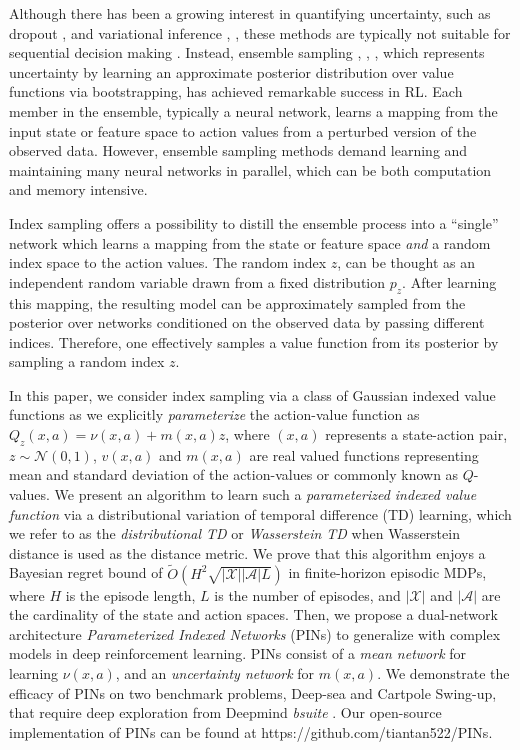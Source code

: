 \documentclass[letterpaper]{article} %
\newcommand{\Sp}[1]{\left(#1\right)}
\newcommand{\abs}[1]{\left|#1\right|}
\newcommand{\aX}{\abs{\mathcal{X}}}
\newcommand{\aA}{\abs{\mathcal{A}}}
\theoremstyle{definition}
\begin{document}
Although there has been a growing interest in quantifying uncertainty, such as dropout \cite{srivastava2014dropout}, \cite{gal2016dropout} and variational inference \cite{fortunato2017noisy}, \cite{touati2018randomized}, these methods are typically not suitable for sequential decision making \cite{osband2018randomized}. Instead, ensemble sampling \cite{osband2016deep}, \cite{lu2017ensemble}, \cite{osband2018randomized}, which represents uncertainty by learning an approximate posterior distribution over value functions via bootstrapping, has achieved remarkable success in RL. Each member in the ensemble, typically a neural network, learns a mapping from the input state or feature space to action values from a perturbed version of the observed data. However, ensemble sampling methods demand learning and maintaining many neural networks in parallel, which can be both computation and memory intensive.

Index sampling \cite{posteriorsampling2019} offers a possibility to distill the ensemble process into a ``single'' network which learns a mapping from the state or feature space \emph{and} a random index space to the action values. The random index $z$, can be thought as an independent random variable drawn from a fixed distribution $p_z$. After learning this mapping, the resulting model can be approximately sampled from the posterior over networks conditioned on the observed data by passing different indices. Therefore, one effectively samples a value function from its posterior by sampling a random index $z$.

In this paper, we consider index sampling via a class of Gaussian indexed value functions as we explicitly \emph{parameterize} the action-value function as $Q_z (x,a) = \nu(x, a) + m(x,a)z$, where $(x, a)$ represents a state-action pair, $z \sim \mathcal{N}(0, 1)$, $v(x,a)$ and $m(x,a)$ are real valued functions representing mean and standard deviation of the action-values or commonly known as $Q$-values. We present an algorithm to learn such a \emph{parameterized indexed value function} via a distributional variation of temporal difference (TD) learning, which we refer to as the \emph{distributional TD} or \emph{Wasserstein TD} when Wasserstein distance is used as the distance metric. We prove that this algorithm enjoys a Bayesian regret bound of $\widetilde{O}\Sp{H^2\sqrt{\aX\aA L}}$ in finite-horizon episodic MDPs, where $H$ is the episode length, $L$ is the number of episodes, and $\aX$ and $\aA$ are the cardinality of the state and action spaces. Then, we propose a dual-network architecture \emph{Parameterized Indexed Networks} (PINs) to  generalize with complex models in deep reinforcement learning. PINs consist of a \emph{mean network} for learning $\nu(x,a)$, and an \emph{uncertainty network} for $m(x,a)$. We demonstrate the efficacy of PINs on two benchmark problems, Deep-sea and Cartpole Swing-up, that require deep exploration from Deepmind \textit{bsuite} \cite{osband2019bsuite}. Our open-source implementation of PINs can be found at https://github.com/tiantan522/PINs.
\end{document}
